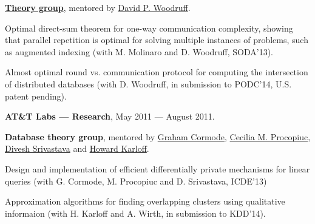 \documentclass[11pt]{article}
\newenvironment{innerlist}[1][\enskip\textbullet]%
        {\begin{compactitem}[#1]}{\end{compactitem}}
\newcommand{\blankline}{\quad\pagebreak[2]}
\begin{document}
\href{http://www.almaden.ibm.com/cs/disciplines/pm/}{\textbf{Theory group}}, mentored by
\href{http://www.almaden.ibm.com/cs/people/dpwoodru/}{David P. Woodruff}. 
\begin{innerlist}
\item Optimal direct-sum theorem for one-way communication complexity, showing that parallel repetition is optimal for solving multiple instances of problems, such as augmented indexing (with M. Molinaro and D. Woodruff, SODA'13). 
\item Almost optimal round vs. communication protocol for computing the intersection of distributed databases (with D. Woodruff, in submission to PODC'14, U.S. patent pending).
\end{innerlist}

\blankline

\textbf{AT\&T Labs --- Research},  May 2011 --- August 2011.

\textbf{Database theory group}, mentored by \href{http://dimacs.rutgers.edu/~graham/}{Graham Cormode}, \href{http://www2.research.att.com/~magda/}{Cecilia M. Procopiuc}, \href{http://www2.research.att.com/~divesh/}{Divesh Srivastava} and \href{http://www.research.att.com/people/Karloff_Howard_J?fbid=MB6sOrb-khf}{Howard Karloff}.
\begin{innerlist}
\item Design and implementation of efficient differentially private mechanisms for linear queries
 (with G. Cormode, M. Procopiuc and D. Srivastava, ICDE'13) %
\item Approximation algorithms for finding overlapping clusters using qualitative informaion (with H. Karloff and A. Wirth, in submission to KDD'14).
\end{innerlist}



%
%
%



\newpage

\if{}
\end{document}
